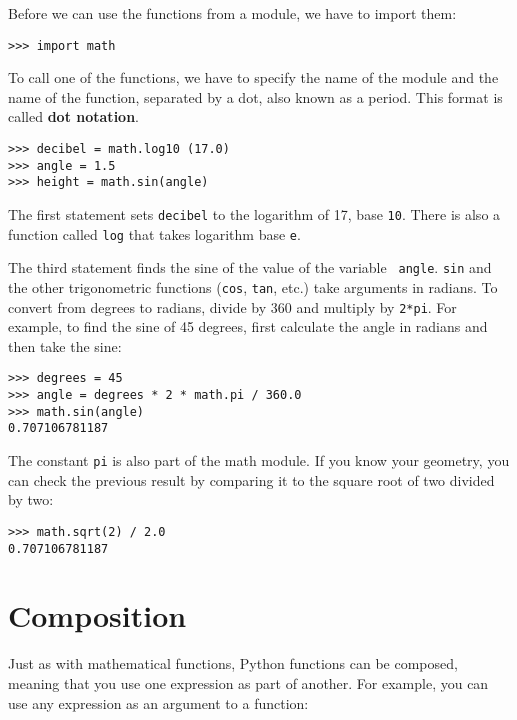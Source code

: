 
Before we can use the functions from a module, we have to import them:

\beforeverb
\begin{verbatim}
>>> import math
\end{verbatim}
\afterverb
%
To call one of the functions, we have to specify the name of the
module and the name of the function, separated by a dot, also
known as a period.  This format is called {\bf dot notation}.


\beforeverb
\begin{verbatim}
>>> decibel = math.log10 (17.0)
>>> angle = 1.5
>>> height = math.sin(angle)
\end{verbatim}
\afterverb
%
The first statement sets {\tt decibel} to the logarithm of 17, base
{\tt 10}.  There is also a function called {\tt log} that takes logarithm
base {\tt e}.

The third statement finds the sine of the value of the variable {\tt
angle}.  {\tt sin} and the other trigonometric functions ({\tt cos},
{\tt tan}, etc.)  take arguments in radians. To convert from degrees
to radians, divide by 360 and multiply by {\tt 2*pi}.  For example, to
find the sine of 45 degrees, first calculate the angle in radians and
then take the sine:

\beforeverb
\begin{verbatim}
>>> degrees = 45
>>> angle = degrees * 2 * math.pi / 360.0
>>> math.sin(angle)
0.707106781187
\end{verbatim}
\afterverb
%
The constant {\tt pi} is also part of the math module.  If you know
your geometry, you can check the previous result by comparing it to
the square root of two divided by two:

\beforeverb
\begin{verbatim}
>>> math.sqrt(2) / 2.0
0.707106781187
\end{verbatim}
\afterverb
%

\section{Composition}

Just as with mathematical functions, Python functions can be composed,
meaning that you use one expression as part of another. For example, you can
use any expression as an argument to a function:

